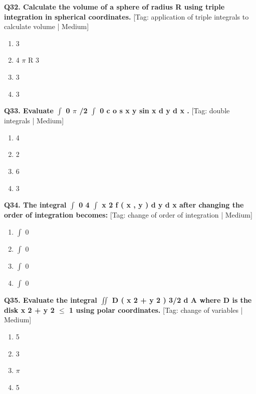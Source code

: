 \noindent\textbf{Q32. Calculate the volume of a sphere of radius R using triple integration in spherical coordinates.} \hfill [Tag: application of triple integrals to calculate volume | Medium]
\begin{enumerate}[label=(\alph*),topsep=2pt,itemsep=1pt,partopsep=0pt,parsep=0pt]
    \item {{3}}
    \item {{4 $\pi$ R 3}}
    \item {{3}}
    \item {{3}}
\end{enumerate}
\vspace{2mm}

\noindent\textbf{Q33. Evaluate $\int$ 0 $\pi$ /2 $\int$ 0 c o s x y sin x d y d x .} \hfill [Tag: double integrals | Medium]
\begin{enumerate}[label=(\alph*),topsep=2pt,itemsep=1pt,partopsep=0pt,parsep=0pt]
    \item {{4}}
    \item {{2}}
    \item {{6}}
    \item {{3}}
\end{enumerate}
\vspace{2mm}

\noindent\textbf{Q34. The integral $\int$ 0 4 $\int$ x 2 f ( x , y ) d y d x after changing the order of integration becomes:} \hfill [Tag: change of order of integration | Medium]
\begin{enumerate}[label=(\alph*),topsep=2pt,itemsep=1pt,partopsep=0pt,parsep=0pt]
    \item {{$\int$ 0}}
    \item {{$\int$ 0}}
    \item {{$\int$ 0}}
    \item {{$\int$ 0}}
\end{enumerate}
\vspace{2mm}

\noindent\textbf{Q35. Evaluate the integral $\iint$ D ( x 2 + y 2 ) 3/2 d A where D is the disk x 2 + y 2 $\le$ 1 using polar coordinates.} \hfill [Tag: change of variables | Medium]
\begin{enumerate}[label=(\alph*),topsep=2pt,itemsep=1pt,partopsep=0pt,parsep=0pt]
    \item {{5}}
    \item {{3}}
    \item {{$\pi$}}
    \item {{5}}
\end{enumerate}
\vspace{2mm}

